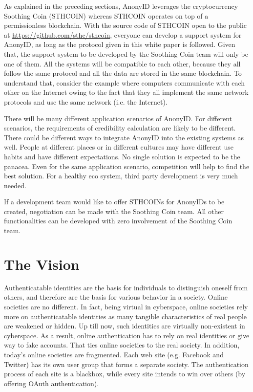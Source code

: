 \documentclass[12pt, a4paper]{article}
\begin{document}
As explained in the preceding sections, AnonyID leverages the cryptocurrency Soothing Coin (STHCOIN) whereas STHCOIN operates on top of a permissionless blockchain. With the source code of STHCOIN open to the public at \href{https://github.com/sthc/sthcoin}{https://github.com/sthc/sthcoin}, everyone can develop a support system for AnonyID, as long as the protocol given in this white paper is followed. Given that, the support system to be developed by the Soothing Coin team will only be one of them. All the systems will be compatible to each other, because they all follow the same protocol and all the data are stored in the same blockchain. To understand that, consider the example where computers communicate with each other on the Internet owing to the fact that they all implement the same network protocols and use the same network (i.e. the Internet).

There will be many different application scenarios of AnonyID. For different scenarios, the requirements of credibility calculation are likely to be different. There could be different ways to integrate AnonyID into the existing systems as well. People at different places or in different cultures may have different use habits and have different expectations.  No single solution is expected to be the panacea. Even for the same application scenario, competition will help to find the best solution. For a healthy eco system, third party development is very much needed.

If a development team would like to offer STHCOINs for AnonyIDs to be created, negotiation can be made with the Soothing Coin team. 
All other functionalities can be developed with zero involvement of the Soothing Coin team.

\section{The Vision}

Authenticatable identities are the basis for individuals to distinguish oneself from others, and therefore are the basis for various behavior in a society. Online societies are no different. In fact, being virtual in cyberspace, online societies rely more on authenticatable identities as many tangible characteristics of real people are weakened or hidden. Up till now, such identities are virtually non-existent in cyberspace. As a result, online authentication has to rely on real identities or give way to fake accounts. That ties online societies to the real society. In addition, today's online societies are fragmented. Each web site (e.g. Facebook and Twitter) has its own user group that forms a separate society. The authentication process of each site is a blackbox, while every site intends to win over others (by offering OAuth authentication). 
\end{document}
